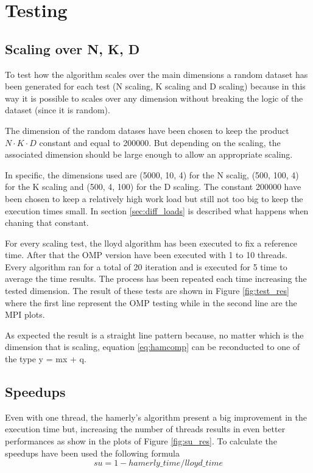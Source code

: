 \documentclass[conference]{IEEEtran}
\begin{document}
\section{Testing}
\subsection{Scaling over N, K, D}
To test how the algorithm scales over the main dimensions a random dataset has been generated for each test (N scaling, K scaling and D scaling) because in this way it is possible to scales over any dimension without breaking the logic of the dataset (since it is random). 

The dimension of the random datases have been chosen to keep the product $N\cdot K\cdot D$ constant and equal to 200000. But depending on the scaling, the associated dimension should be large enough to allow an appropriate scaling. 

In specific, the dimensions used are (5000, 10, 4) for the N scalig, (500, 100, 4) for the K scaling and (500, 4, 100) for the D scaling. The constant 200000 have been chosen to keep a relatively high work load but still not too big to keep the execution times small. In section \ref{sec:diff_loads} is described what happens when chaning that constant.

For every scaling test, the lloyd algorithm has been executed to fix a reference time. After that the OMP version have been executed with 1 to 10 threads. Every algorithm ran for a total of 20 iteration and is executed for 5 time to average the time results. The process has been repeated each time increasing the tested dimension. The result of these tests are shown in Figure \ref{fig:test_res} where the first line represent the OMP testing while in the second line are the MPI plots.

As expected the result is a straight line pattern because, no matter which is the dimension that is scaling, equation \ref{eq:hamcomp} can be reconducted to one of the type y = mx + q.

\subsection{Speedups}
Even with one thread, the hamerly's algorithm present a big improvement in the execution time but, increasing the number of threads results in even better performances as show in the plots of Figure \ref{fig:su_res}. To calculate the speedups have been used the following formula
\begin{equation}
  su = 1 - hamerly\_time / lloyd\_time
\end{equation}
\end{document}
